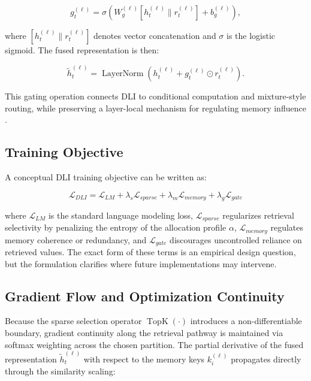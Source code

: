 \begin{equation}
g_t^{(\ell)} = \sigma\left(W_g^{(\ell)}[h_t^{(\ell)} \parallel r_t^{(\ell)}] + b_g^{(\ell)}\right),
\end{equation}

where $[h_t^{(\ell)} \parallel r_t^{(\ell)}]$ denotes vector concatenation and $\sigma$ is the logistic sigmoid. The fused representation is then:

\begin{equation}
\tilde{h}_t^{(\ell)} = \operatorname{LayerNorm}\left(h_t^{(\ell)} + g_t^{(\ell)} \odot r_t^{(\ell)}\right).
\end{equation}

This gating operation connects DLI to conditional computation and mixture-style routing, while preserving a layer-local mechanism for regulating memory influence \cite{Lepikhin2020, Bulatov2022}.

\subsection{Training Objective}
A conceptual DLI training objective can be written as:

\begin{equation}
\mathcal{L}_{DLI} = \mathcal{L}_{LM} + \lambda_s \mathcal{L}_{sparse} + \lambda_m \mathcal{L}_{memory} + \lambda_g \mathcal{L}_{gate}
\end{equation}

where $\mathcal{L}_{LM}$ is the standard language modeling loss, $\mathcal{L}_{sparse}$ regularizes retrieval selectivity by penalizing the entropy of the allocation profile $\alpha$, $\mathcal{L}_{memory}$ regulates memory coherence or redundancy, and $\mathcal{L}_{gate}$ discourages uncontrolled reliance on retrieved values. The exact form of these terms is an empirical design question, but the formulation clarifies where future implementations may intervene.

\subsection{Gradient Flow and Optimization Continuity}
Because the sparse selection operator $\operatorname{TopK}(\cdot)$ introduces a non-differentiable boundary, gradient continuity along the retrieval pathway is maintained via softmax weighting across the chosen partition. The partial derivative of the fused representation $\tilde{h}_t^{(\ell)}$ with respect to the memory keys $k_i^{(\ell)}$ propagates directly through the similarity scaling:


